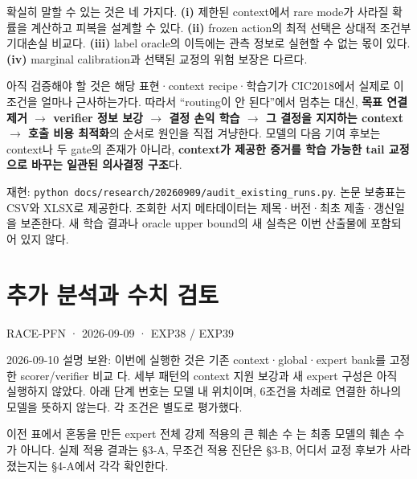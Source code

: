 확실히 말할 수 있는 것은 네 가지다. \textbf{(i)} 제한된 context에서 rare mode가 사라질 확률을 계산하고 피복을 설계할 수 있다. \textbf{(ii)} frozen action의 최적 선택은 상대적 조건부 기대손실 비교다. \textbf{(iii)} label oracle의 이득에는 관측 정보로 실현할 수 없는 몫이 있다. \textbf{(iv)} marginal calibration과 선택된 교정의 위험 보장은 다르다.

아직 검증해야 할 것은 해당 표현·context recipe·학습기가 CIC2018에서 실제로 이 조건을 얼마나 근사하는가다. 따라서 “routing이 안 된다”에서 멈추는 대신, \textbf{목표 연결 제거  \ensuremath{\rightarrow}  verifier 정보 보강  \ensuremath{\rightarrow}  결정 손익 학습  \ensuremath{\rightarrow}  그 결정을 지지하는 context  \ensuremath{\rightarrow}  호출 비용 최적화}의 순서로 원인을 직접 겨냥한다. 모델의 다음 기여 후보는 context나 두 gate의 존재가 아니라, \textbf{context가 제공한 증거를 학습 가능한 tail 교정으로 바꾸는 일관된 의사결정 구조}다.

재현: \texttt{python d\allowbreak{}ocs/\allowbreak{}\allowbreak{}rese\allowbreak{}arch/\allowbreak{}\allowbreak{}202\allowbreak{}60909/\allowbreak{}\allowbreak{}au\allowbreak{}dit\_\allowbreak{}\allowbreak{}exis\allowbreak{}ting\_\allowbreak{}\allowbreak{}run\allowbreak{}s.\allowbreak{}py}. 논문 보충표는 CSV와 XLSX로 제공한다. 조회한 서지 메타데이터는 제목·버전·최초 제출·갱신일을 보존한다. 새 학습 결과나 oracle upper bound의 새 실측은 이번 산출물에 포함되어 있지 않다.



\section{추가 분석과 수치 검토}
RACE-PFN · 2026-09-09 · EXP38 /\allowbreak{} EXP39

2026-09-10 설명 보완: 이번에 실행한 것은 기존 context·global·expert bank를 고정한 scorer/\allowbreak{}verifier 비교 다. 세부 패턴의 context 지원 보강과 새 expert 구성은 아직 실행하지 않았다. 아래 단계 번호는 모델 내 위치이며, 6조건을 차례로 연결한 하나의 모델을 뜻하지 않는다. 각 조건은 별도로 평가했다.

이전 표에서 혼동을 만든 expert 전체 강제 적용의 큰 훼손 수 는 최종 모델의 훼손 수가 아니다. 실제 적용 결과는 §3-A, 무조건 적용 진단은 §3-B, 어디서 교정 후보가 사라졌는지는 §4-A에서 각각 확인한다.

